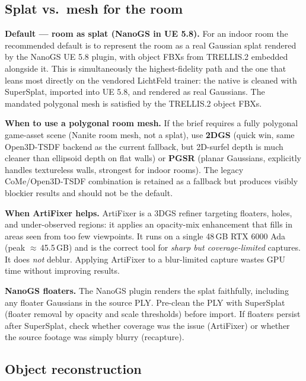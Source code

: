 \subsection{Splat vs.\ mesh for the room}
\label{sec:pb-splat-vs-mesh}

\textbf{Default --- room as splat (NanoGS in UE 5.8).}  For an indoor room the
recommended default is to represent the room as a real Gaussian splat rendered
by the NanoGS UE 5.8 plugin, with object FBXs from TRELLIS.2 embedded
alongside it.  This is simultaneously the highest-fidelity path and the one
that leans most directly on the vendored LichtFeld trainer: the native
 is cleaned with SuperSplat, imported into UE 5.8, and
rendered as real Gaussians.  The mandated polygonal mesh is satisfied by the
TRELLIS.2 object FBXs.

\textbf{When to use a polygonal room mesh.}  If the brief requires a fully
polygonal game-asset scene (Nanite room mesh, not a splat), use \textbf{2DGS}
(quick win, same Open3D-TSDF backend as the current fallback, but 2D-surfel
depth is much cleaner than ellipsoid depth on flat walls) or \textbf{PGSR}
(planar Gaussians, explicitly handles textureless walls, strongest for indoor
rooms).  The legacy CoMe/Open3D-TSDF combination is retained as a fallback
but produces visibly blockier results and should not be the default.

\textbf{When ArtiFixer helps.}  ArtiFixer is a 3DGS refiner targeting
floaters, holes, and under-observed regions: it applies an opacity-mix
enhancement that fills in areas seen from too few viewpoints.  It runs on a
single 48\,GB RTX 6000 Ada (peak $\approx$\,45.5\,GB) and is the correct tool
for \emph{sharp but coverage-limited} captures.  It does \emph{not} deblur.
Applying ArtiFixer to a blur-limited capture wastes GPU time without improving
results.

\textbf{NanoGS floaters.}  The NanoGS plugin renders the splat faithfully,
including any floater Gaussians in the source PLY.  Pre-clean the PLY with
SuperSplat (floater removal by opacity and scale thresholds) before import.
If floaters persist after SuperSplat, check whether coverage was the issue
(ArtiFixer) or whether the source footage was simply blurry (recapture).

\subsection{Object reconstruction}
\label{sec:pb-objects}

